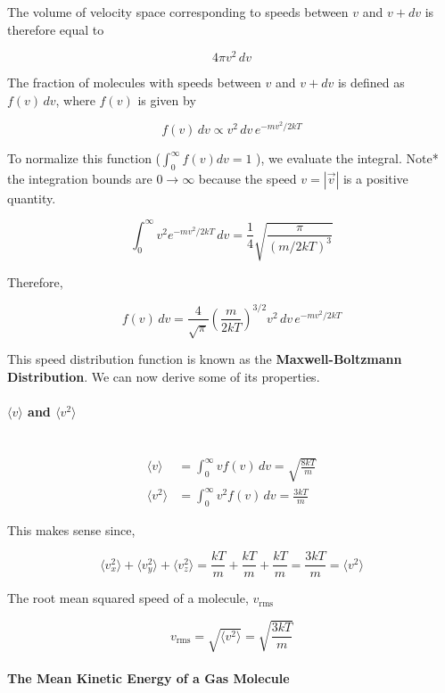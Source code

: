 \documentclass[svgnames]{article}     %
\begin{document}
The volume of velocity space corresponding to speeds between $v$ and $v+dv$ is
therefore equal to 

\[4\pi v^2 \, dv\] 

The fraction of molecules with speeds between $v$ and $v+dv$ is defined as
$f(v)\,dv$, where $f(v)$ is given by 

\[
  \boxed{f(v) \, dv \propto v^2 \, dv \, e^{-mv^2 / 2kT} }
\] \vspace{5px}

To normalize this function ($\int_0^\infty f(v)dv = 1$ ), we evaluate the
integral. Note* the integration bounds are $0\to\infty$ because the speed $v
= |\vec{v}|$ is a positive quantity. 

\[
  \int_0^\infty v^2 e^{-mv^2 / 2kT}\, dv
  = \frac{1}{4}\sqrt{\frac{\pi}{(m/2kT)^3}}
\] \vspace{5px}

Therefore, 

\[
  \boxed{f(v) \, dv = \frac{4}{\sqrt{\pi}} \left( \frac{m}{2kT} \right)^{3/2}
  v^2 \, dv \, e^{-mv^2 / 2kT} }
\] \vspace{5px}

This speed distribution function is known as the  \textbf{Maxwell-Boltzmann
Distribution}. We can now derive some of its properties. 

\paragraph{ $\langle v \rangle$ and $\langle v^2 \rangle$ } \mbox{} \\
\begin{align*}
  \langle v \rangle &= \int_{0}^{\infty} vf(v) \, dv = \sqrt{\frac{8kT}{m}}\\
  \langle v^2 \rangle &= \int_{0}^{\infty} v^2 f(v) \, dv = \frac{3kT}{m}
\end{align*}

This makes sense since, 

\[
\langle v_x^2 \rangle + \langle v_y^2 \rangle + \langle v_z^2 \rangle
= \frac{kT}{m} + \frac{kT}{m} + \frac{kT}{m} = \frac{3kT}{m} = \langle v^2
\rangle
\] \vspace{5px}

The root mean squared speed of a molecule, $v_\text{rms}$ 

\[
  v_\text{rms} = \sqrt{\langle v^2 \rangle} = \sqrt{\frac{3kT}{m}}
\] \vspace{5px}
\paragraph{The Mean Kinetic Energy of a Gas Molecule} \mbox{} \\
\end{document}
